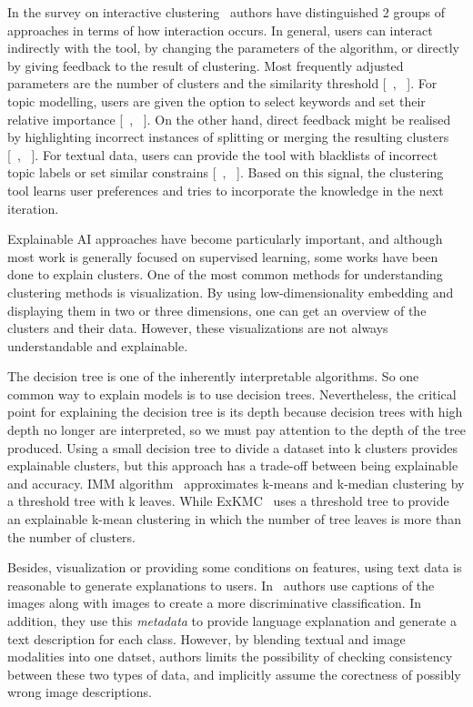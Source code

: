 \documentclass[
 twocolumn,
 hf,
]{ceurart}
\begin{document}
In the survey on interactive clustering~\cite{10.1145/3340960} authors have distinguished 2 groups of approaches in terms of how interaction occurs.
In general, users can interact indirectly with the tool, by changing the parameters of the algorithm, or directly by giving feedback to the result of clustering.
Most frequently adjusted parameters are the number of clusters and the similarity threshold [~\cite{10.1007/978-3-319-23461-8_43}, ~\cite{10.1016/j.eswa.2017.11.055}].
For topic modelling, users are given the option to select keywords and set their relative importance [~\cite{ElAssady2018ProgressiveLO}, ~\cite{Choo2013UTOPIANUT}].
On the other hand, direct feedback might be realised by highlighting incorrect instances of splitting or merging the resulting clusters [~\cite{10.1155/2017/4915828}, ~\cite{10.1111/j.1467-8659.2012.03108.x}].
For textual data, users can provide the tool with blacklists of incorrect topic labels or set similar constrains [~\cite{Chang2016AppGrouperKI}, ~\cite{hu-etal-2011-interactive}].
Based on this signal, the clustering tool learns user preferences and tries to incorporate the knowledge in the next iteration.

Explainable AI approaches have become particularly important, and although most work is generally focused on supervised learning, some works have been done to explain clusters.
One of the most common methods for understanding clustering methods is visualization. 
By using low-dimensionality embedding and displaying them in two or three dimensions, one can get an overview of the clusters and their data. 
However, these visualizations are not always understandable and explainable. 

The decision tree is one of the inherently interpretable algorithms. 
So one common way to explain models is to use decision trees. 
Nevertheless, the critical point for explaining the decision tree is its depth because decision trees with high depth no longer are interpreted, so we must pay attention to the depth of the tree produced. 
Using a small decision tree to divide a dataset into k clusters provides explainable clusters, but this approach has a trade-off between being explainable and accuracy. 
IMM algorithm~\cite{dasgupta2020explainable} approximates k-means and k-median clustering by a threshold tree with k leaves.
While ExKMC~\cite{frost2020exkmc} uses a threshold tree to provide an explainable k-mean clustering in which the number of tree leaves is more than the number of clusters.

Besides, visualization or providing some conditions on features, using text data is reasonable to generate explanations to users.
In~\cite{hendricks2016generating} authors use captions of the images along with images to create a more discriminative classification. 
In addition, they use this \textit{metadata} to provide language explanation and generate a text description for each class.
However, by blending textual and image modalities into one datset, authors limits the possibility of checking consistency between these two types of data, and implicitly assume the corectness of possibly wrong image descriptions.
\end{document}
